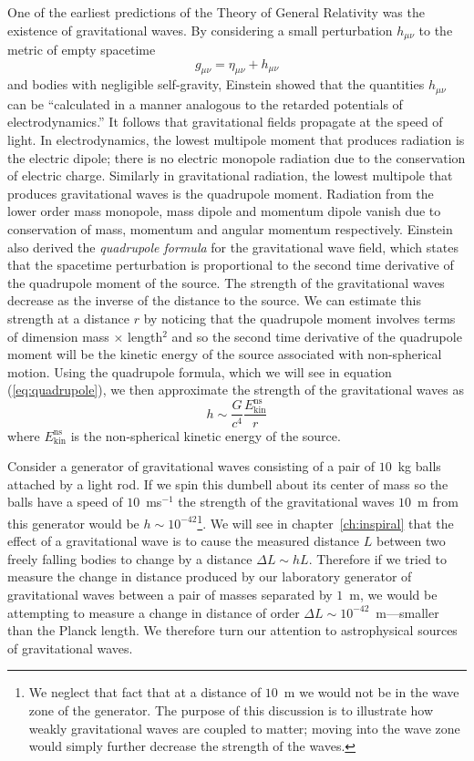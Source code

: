 One of the earliest predictions of the Theory of General Relativity was the
existence of gravitational waves. By considering a small perturbation
$h_{\mu\nu}$ to the metric of empty spacetime
\begin{equation}
g_{\mu\nu} = \eta_{\mu\nu} + h_{\mu\nu}
\end{equation}
and bodies with negligible self-gravity, Einstein showed that the quantities
$h_{\mu\nu}$ can be ``calculated in a manner analogous to the retarded
potentials of electrodynamics\cite{Einstein:1916}.''  It follows that
gravitational fields propagate at the speed of light.  In electrodynamics, the
lowest multipole moment that produces radiation is the electric dipole; there
is no electric monopole radiation due to the conservation of electric charge.
Similarly in gravitational radiation, the lowest multipole that produces
gravitational waves is the quadrupole moment. Radiation from the lower order
mass monopole, mass dipole and momentum dipole vanish due to conservation of
mass, momentum and angular momentum respectively. Einstein also derived the
\emph{quadrupole formula} for the gravitational wave field, which states that
the spacetime perturbation is proportional to the second time derivative of
the quadrupole moment of the source.  The strength of the gravitational waves
decrease as the inverse of the distance to the source.  We can estimate
this strength at a distance $r$ by noticing that the quadrupole moment
involves terms of dimension mass $\times$ length$^2$ and so the second time
derivative of the quadrupole moment will be the kinetic energy of the source
associated with non-spherical motion. Using the quadrupole formula, which we
will see in equation (\ref{eq:quadrupole}), we then approximate the strength
of the gravitational waves as
\begin{equation}
h \sim \frac{G}{c^4}\frac{E^\mathrm{ns}_\mathrm{kin}}{r}
\label{eq:strainest}
\end{equation}
where $E^\mathrm{ns}_\mathrm{kin}$ is the non-spherical kinetic energy of
the source.

Consider a generator of gravitational waves consisting of a pair of $10$~kg
balls attached by a light rod. If we spin this dumbell about its center of
mass so the balls have a speed of $10$~ms$^{-1}$ the strength of the
gravitational waves $10$~m from this generator would be $h \sim
10^{-42}$\footnote{We neglect that fact that at a distance of $10$~m we would
not be in the wave zone of the generator. The purpose of this discussion is to
illustrate how weakly gravitational waves are coupled to matter; moving into
the wave zone would simply further decrease the strength of the waves.}.  We
will see in chapter~\ref{ch:inspiral} that the effect of a gravitational wave
is to cause the measured distance $L$ between two freely falling bodies to
change by a distance $\Delta L \sim h L$. Therefore if we tried to
measure the change in distance produced by our laboratory generator of
gravitational waves between a pair of masses separated by $1$~m, we would be
attempting to measure a change in distance of order $\Delta L \sim
10^{-42}$~m---smaller than the Planck length.  We therefore turn our
attention to astrophysical sources of gravitational waves.

